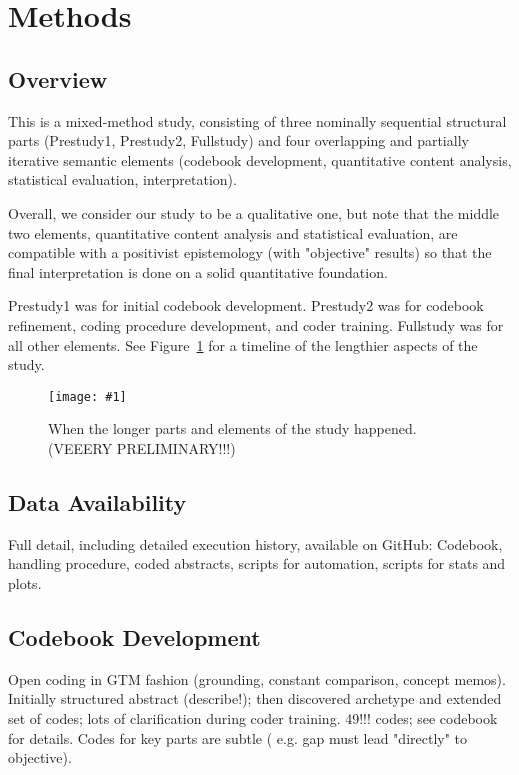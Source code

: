 \documentclass[10pt,journal,compsoc]{IEEEtran}
\newcommand{\Plot}[2]{%
	\begin{figure}[!t]%
		\centering\texttt{[image: \#1]}%
		\vspace{-4mm}\caption{#2}\label{#1}%
	\end{figure}}
\begin{document}
\section{Methods}


\subsection{Overview}

\noindent
This is a mixed-method study, consisting of three nominally sequential structural parts
(Prestudy1, Prestudy2, Fullstudy) and
four overlapping and partially iterative semantic elements
(codebook development, quantitative content analysis,
statistical evaluation, interpretation).

Overall, we consider our study to be a qualitative one, but note that the middle two elements,
quantitative content analysis and statistical evaluation,
are compatible with a positivist epistemology (with "objective" results) so that 
the final interpretation is done on a solid quantitative foundation.

Prestudy1 was for initial codebook development.
Prestudy2 was for codebook refinement,
coding procedure development,
and coder training.
Fullstudy was for all other elements.
See Figure~\ref{qabstracts_timeline} for a timeline of the lengthier aspects of the study.

\Plot{qabstracts_timeline}{%
	When the longer parts and elements of the study happened. (VEEERY PRELIMINARY!!!)}


\subsection{Data Availability}

\noindent
Full detail, including detailed execution history, available on GitHub:
Codebook, handling procedure, coded abstracts, scripts for automation, scripts for stats and plots.


\subsection{Codebook Development}

\noindent
Open coding in GTM fashion (grounding, constant comparison, concept memos).
Initially structured abstract (describe!); then discovered archetype and extended set of codes; lots of clarification during coder training.
49!!! codes; see codebook for details.
Codes for key parts are subtle ( e.g. gap must lead "directly" to objective).
\end{document}

